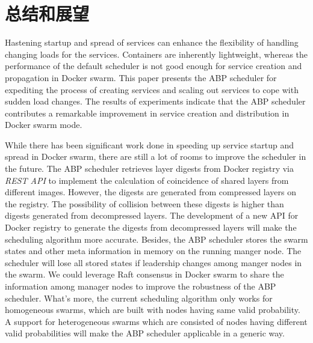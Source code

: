 \chapter{总结和展望}\label{chap:summary}
Hastening startup and spread of services can enhance the flexibility of handling changing loads for the services. Containers are inherently lightweight, whereas the performance of the default scheduler is not good enough for service creation and propagation in Docker swarm. This paper presents the ABP scheduler for expediting the process of creating services and scaling out services to cope with sudden load changes. The results of experiments indicate that the ABP scheduler contributes a remarkable improvement in service creation and distribution in Docker swarm mode.

While there has been significant work done in speeding up service startup and spread in Docker swarm, there are still a lot of rooms to improve the scheduler in the future. The ABP scheduler retrieves layer digests from Docker registry via \emph{REST API} to implement the calculation of coincidence of shared layers from different images. However, the digests are generated from compressed layers on the registry. The possibility of collision between these digests is higher than digests generated from decompressed layers. The development of a new API for Docker registry to generate the digests from decompressed layers will make the scheduling algorithm more accurate. Besides, the ABP scheduler stores the swarm states and other meta information in memory on the running manger node. The scheduler will lose all stored states if leadership changes among manger nodes in the swarm. We could leverage Raft consensus in Docker swarm to share the information among manager nodes to improve the robustness of the ABP scheduler. What's more, the current scheduling algorithm only works for homogeneous swarms, which are built with nodes having same valid probability. A support for heterogeneous swarms which are consisted of nodes having different valid probabilities will make the ABP scheduler applicable in a generic way.
